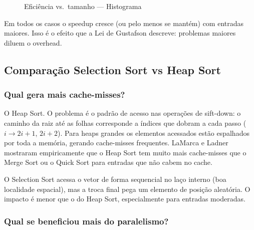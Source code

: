 \documentclass[12pt]{article}
\begin{document}
\begin{figure}[H]
\centering
{}
\caption{Eficiência vs.\ tamanho --- Histograma}
\end{figure}

Em todos os casos o speedup cresce (ou pelo menos se mantém) com entradas maiores. Isso é o efeito que a Lei de Gustafson descreve: problemas maiores diluem o overhead.

\subsection{Comparação Selection Sort vs Heap Sort}

\subsubsection{Qual gera mais cache-misses?}

O Heap Sort. O problema é o padrão de acesso nas operações de sift-down: o caminho da raiz até as folhas corresponde a índices que dobram a cada passo ($i \to 2i+1$, $2i+2$). Para heaps grandes os elementos acessados estão espalhados por toda a memória, gerando cache-misses frequentes. LaMarca e Ladner \cite{lamarca1999} mostraram empiricamente que o Heap Sort tem muito mais cache-misses que o Merge Sort ou o Quick Sort para entradas que não cabem no cache.

O Selection Sort acessa o vetor de forma sequencial no laço interno (boa localidade espacial), mas a troca final pega um elemento de posição aleatória. O impacto é menor que o do Heap Sort, especialmente para entradas moderadas.

\subsubsection{Qual se beneficiou mais do paralelismo?}
\end{document}
